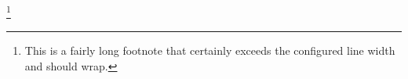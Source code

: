 \footnote{This is a fairly long footnote that certainly exceeds the configured line width and should wrap.}
